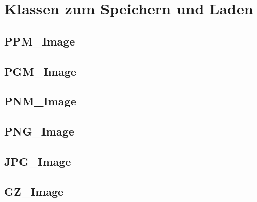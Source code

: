 \documentclass[12pt,a4paper,draft,twoside,onecolumn,titlepage]{book}
\begin{document}
\part{Klassen zum Speichern und Laden}
\chapter{PPM\_Image}
\label{classppmimage}
\chapter{PGM\_Image}
\label{classpgmimage}
\chapter{PNM\_Image}
\label{classpnmimage}
\chapter{PNG\_Image}
\label{classpngimage}
\chapter{JPG\_Image}
\label{classjpgimage}
\chapter{GZ\_Image}
\label{classgzimage}
\end{document}
